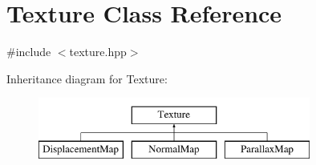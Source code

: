 \hypertarget{class_texture}{}\section{Texture Class Reference}
\label{class_texture}


{\ttfamily \#include $<$texture.\+hpp$>$}

Inheritance diagram for Texture\+:\begin{figure}[H]
\begin{center}
\leavevmode
\includegraphics[height=2.000000cm]{class_texture}
\end{center}
\end{figure}
